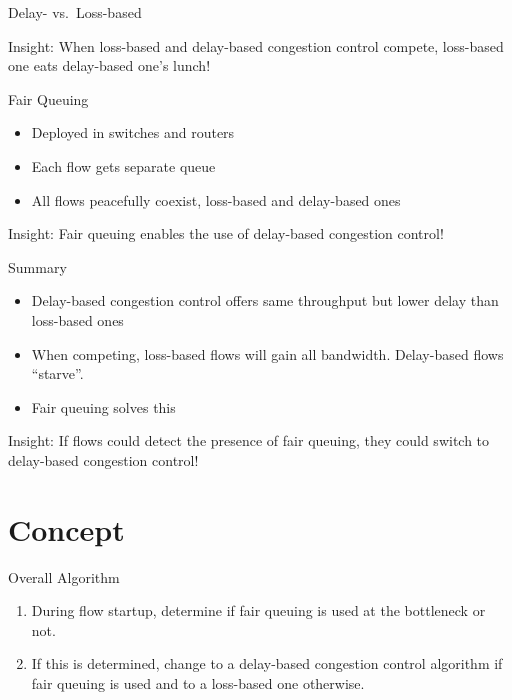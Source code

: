 \documentclass[xcolor={dvipsnames}]{beamer}
\begin{document}
\begin{frame}{Delay- vs.~Loss-based}
\begin{block}{Insight:}
When loss-based and delay-based congestion control compete, loss-based one eats delay-based one's lunch!\end{block}
\end{frame}

\begin{frame}{Fair Queuing}
\begin{itemize}
\item Deployed in switches and routers
\item Each flow gets separate queue
\item All flows peacefully coexist, loss-based and delay-based ones
\end{itemize}
\begin{block}{Insight:}
Fair queuing enables the use of delay-based congestion control!
\end{block}
\end{frame}

\begin{frame}{Summary}
\begin{itemize}
\item Delay-based congestion control offers same throughput but lower delay than loss-based ones
\item When competing, loss-based flows will gain all bandwidth. Delay-based flows ``starve''. 
\item Fair queuing solves this
\end{itemize}
\begin{block}{Insight:}
If flows could detect the presence of fair queuing, they could switch to delay-based congestion control!
\end{block}
\end{frame}

\section{Concept}
\begin{frame}{Overall Algorithm}
\begin{enumerate}
\item During flow startup, determine if fair queuing is used at the bottleneck or not.
\item If this is determined, change to a delay-based congestion control algorithm if fair queuing is used and to a loss-based one otherwise.
\end{enumerate}
\end{frame}
\end{document}
